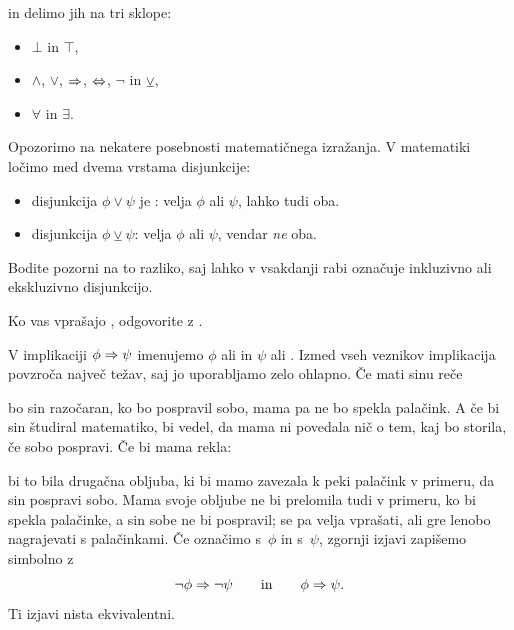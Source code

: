 %
in delimo jih na tri sklope:
%
\begin{itemize}
\item {} $\bot$ in $\top$,
\item {} $\land$, $\lor$, $\Rightarrow$, $\Leftrightarrow$, $\neg$ in $\veebar$,
\item {} $\forall$ in $\exists$.
\end{itemize}
%
Opozorimo na nekatere posebnosti matematičnega izražanja.
%
V matematiki ločimo med dvema vrstama disjunkcije:
%
\begin{itemize}
\item disjunkcija $\phi \lor \psi$ je : velja $\phi$ ali $\psi$, lahko tudi oba.
\item {} disjunkcija $\phi \veebar \psi$: velja $\phi$ ali $\psi$, vendar \emph{ne} oba.
\end{itemize}
%
Bodite pozorni na to razliko, saj lahko v vsakdanji rabi  označuje inkluzivno ali ekskluzivno disjunkcijo.

\begin{vaja}
  Ko vas vprašajo , odgovorite z .
\end{vaja}

V implikaciji $\phi \Rightarrow \psi$ imenujemo $\phi$  ali  in $\psi$  ali .
%
Izmed vseh veznikov implikacija povzroča največ težav, saj jo uporabljamo zelo ohlapno. Če mati sinu reče
%
\begin{quote}
\end{quote}
%
bo sin razočaran, ko bo pospravil sobo, mama pa ne bo spekla palačink.
%
A če bi sin študiral matematiko, bi vedel, da mama ni povedala nič o tem, kaj bo storila, če sobo pospravi. Če bi mama rekla:
%
\begin{quote}
\end{quote}
%
bi to bila drugačna obljuba, ki bi mamo zavezala k peki palačink v primeru, da sin pospravi sobo.
%
Mama svoje obljube ne bi prelomila tudi v primeru, ko bi spekla palačinke, a sin sobe ne bi pospravil; se pa velja vprašati, ali gre lenobo nagrajevati s palačinkami.
%
Če označimo  s~$\phi$ in  s~$\psi$, zgornji izjavi zapišemo simbolno z
%
\begin{equation*}
  \neg \phi \Rightarrow \neg \psi
  \qquad\text{in}\qquad
  \phi \Rightarrow \psi.
\end{equation*}
%
Ti izjavi nista ekvivalentni.

